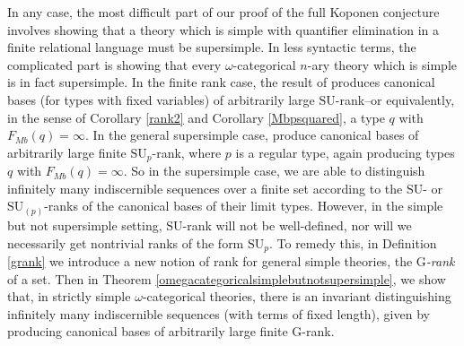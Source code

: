 \documentclass[11pt]{amsart}
\theoremstyle{definition}
\theoremstyle{remark}
\numberwithin{equation}{section}
\begin{document}
In any case, the most difficult part of our proof of the full Koponen conjecture involves showing that a theory which is simple with quantifier elimination in a finite relational language must be supersimple. In less syntactic terms, the complicated part is showing that every $\omega$-categorical $n$-ary theory which is simple is in fact supersimple. In the finite rank case, the result of \cite{TW03} produces canonical bases (for types with fixed variables) of arbitrarily large $\mathrm{SU}$-rank--or equivalently, in the sense of Corollary \ref{rank2} and Corollary \ref{Mbpsquared}, a type $q$ with $F_{Mb}(q) = \infty$. In the general supersimple case, \cite{TW03} produce canonical bases of arbitrarily large finite $\mathrm{SU}_{p}$-rank, where $p$ is a regular type, again producing types $q$ with $F_{Mb}(q) = \infty$. So in the supersimple case, we are able to distinguish infinitely many indiscernible sequences over a finite set according to the $\mathrm{SU}$- or $\mathrm{SU}_{(p)}$-ranks of the canonical bases of their limit types. However, in the simple but not supersimple setting, $\mathrm{SU}$-rank will not be well-defined, nor will we necessarily get nontrivial ranks of the form $\mathrm{SU}_{p}$. To remedy this, in Definition \ref{grank} we introduce a new notion of rank for general simple theories, the \textit{$\mathrm{G}$-rank} of a set. Then in Theorem \ref{omegacategoricalsimplebutnotsupersimple}, we show that, in strictly simple $\omega$-categorical theories, there is an invariant distinguishing infinitely many indiscernible sequences (with terms of fixed length), given by producing canonical bases of arbitrarily large finite $\mathrm{G}$-rank.
\end{document}
